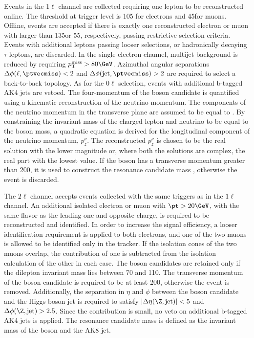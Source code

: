 Events in the $1\ell$ channel are collected requiring one lepton to be reconstructed online. The \pt threshold at trigger level is 105\GeV 
for electrons and 45\GeV for muons. Offline, events are accepted if there is exactly one reconstructed electron or muon with \pt larger 
than 135\GeV or 55\GeV, respectively, passing restrictive selection criteria. Events with additional leptons passing looser selections, or 
hadronically decaying $\tau$ leptons, are discarded. In the single-electron channel, multijet background is reduced by requiring 
$\MET>80\GeV$. Azimuthal angular separations $\Delta \phi (\ell, \ptvecmiss) < 2$ and $\Delta \phi (\text{jet}, \ptvecmiss) > 2$ are 
required to select a back-to-back topology.
As for the $0\ell$ selection, events with additional b-tagged AK4 jets are vetoed.
The four-momentum of the \PW boson candidate is quantified using a kinematic reconstruction of the neutrino momentum.
The components of the neutrino momentum in the transverse plane are assumed to be equal to \ptvecmiss. By constraining the invariant mass 
of the charged lepton and neutrino to be equal to the \PW boson mass, a quadratic equation is derived for the longitudinal component of the 
neutrino momentum, $p_z^\nu$.
The reconstructed $p_z^\nu$ is chosen to be the real solution with the lower magnitude or, where both the solutions are complex, the real 
part with the lowest value.
If the \PW boson has a transverse momentum greater than 200\GeV, it is used to construct the resonance candidate mass \mVH, otherwise the 
event is discarded.


The $2\ell$ channel accepts events collected with the same triggers as in the $1\ell$ channel. An additional isolated electron or muon with 
$\pt > 20\GeV$, with the same flavor as the leading one and opposite charge, is required to be reconstructed and identified. In order to 
increase the signal efficiency, a looser identification requirement is applied to both electrons, and one of the two muons is allowed to be 
identified only in the tracker. If the isolation cones of the two muons overlap, the contribution of one is subtracted from the isolation 
calculation of the other in each case.
The \Z boson candidates are retained only if the dilepton invariant mass lies between $70$ and 110\GeV. The transverse momentum of the \Z 
boson candidate is required to be at least 200\GeV, otherwise the event is removed. Additionally, the separation in $\eta$ and $\phi$ 
between the \Z boson candidate and the Higgs boson jet is required to satisfy $| \Delta \eta (\Z,\text{jet})| < 5$ and 
$\Delta \phi (\Z,\text{jet}) >2.5$. Since the \ttbar contribution is small, no veto on additional b-tagged AK4 jets is applied.
The resonance candidate mass \mVH is defined as the invariant mass of the \Z boson and the AK8 jet.

